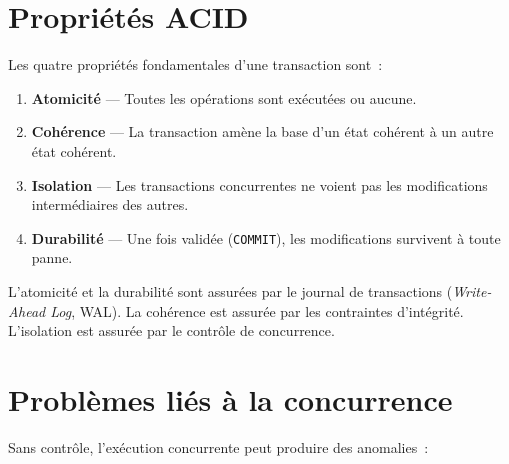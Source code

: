 \section{Propri\'et\'es ACID}

\begin{definition}
Les quatre propri\'et\'es fondamentales d'une transaction sont~:
\begin{enumerate}
  \item \textbf{Atomicit\'e} --- Toutes les op\'erations sont ex\'ecut\'ees ou aucune.
  \item \textbf{Coh\'erence} --- La transaction am\`ene la base d'un \'etat
        coh\'erent \`a un autre \'etat coh\'erent.
  \item \textbf{Isolation} --- Les transactions concurrentes ne voient pas
        les modifications interm\'ediaires des autres.
  \item \textbf{Durabilit\'e} --- Une fois valid\'ee (\texttt{COMMIT}), les
        modifications survivent \`a toute panne.
\end{enumerate}
\end{definition}

\begin{remarque}
L'atomicit\'e et la durabilit\'e sont assur\'ees par le journal de
transactions (\emph{Write-Ahead Log}, WAL). La coh\'erence est assur\'ee
par les contraintes d'int\'egrit\'e. L'isolation est assur\'ee par le
contr\^ole de concurrence.
\end{remarque}

\section{Probl\`emes li\'es \`a la concurrence}

Sans contr\^ole, l'ex\'ecution concurrente peut produire des anomalies~:

